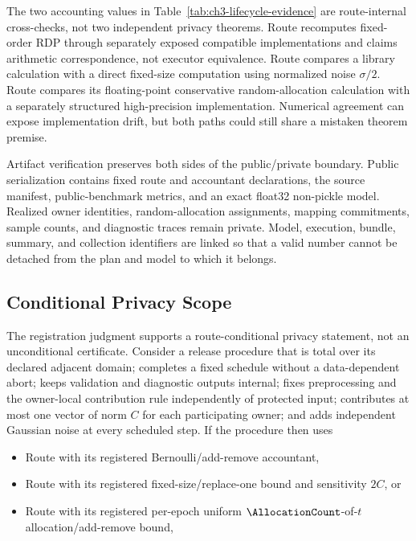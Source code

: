 The two accounting values in
Table~\ref{tab:ch3-lifecycle-evidence} are route-internal cross-checks, not two
independent privacy theorems.  Route \RouteP{} recomputes fixed-order RDP through
separately exposed compatible implementations and claims arithmetic
correspondence, not executor equivalence.  Route \RouteF{} compares a library
calculation with a direct fixed-size computation using normalized noise
\(\sigma/2\).  Route \RouteA{} compares its floating-point conservative
random-allocation calculation with a separately structured high-precision
implementation.  Numerical agreement can expose implementation drift, but both
paths could still share a mistaken theorem premise.

Artifact verification preserves both sides of the public/private boundary.
Public serialization contains fixed route and accountant declarations, the source
manifest, public-benchmark metrics, and an exact float32 non-pickle model.
Realized owner identities, random-allocation assignments, mapping commitments,
sample counts, and diagnostic traces remain private.  Model, execution, bundle,
summary, and collection identifiers are linked so that a valid number cannot be
detached from the plan and model to which it belongs.

\subsection{Conditional Privacy Scope}
\label{subsec:ch3-conditional-scope}

The registration judgment supports a route-conditional privacy statement, not an
unconditional certificate.  Consider a release procedure that is total over its
declared adjacent domain; completes a fixed schedule without a data-dependent
abort; keeps validation and diagnostic outputs internal; fixes preprocessing and
the owner-local contribution rule independently of protected input; contributes
at most one vector of norm \(C\) for each participating owner; and adds independent
Gaussian noise at every scheduled step.  If the procedure then uses

\begin{itemize}
    \item Route \RouteP{} with its registered Bernoulli/add-remove accountant,
    \item Route \RouteF{} with its registered fixed-size/replace-one bound and
    sensitivity \(2C\), or
    \item Route \RouteA{} with its registered per-epoch uniform
    \(\AllocationCount\)-of-\(t\) allocation/add-remove bound,
\end{itemize}

